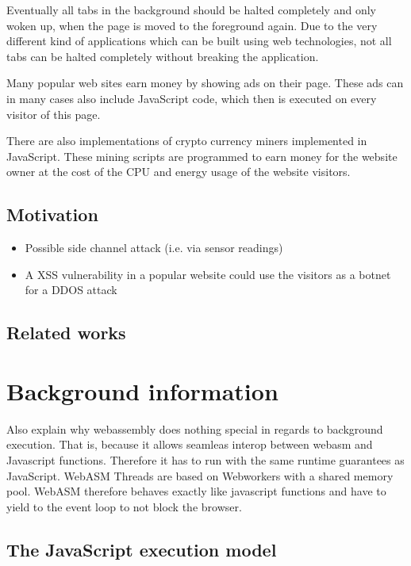 \documentclass[article,type=bsc,colorback,accentcolor=tud9c]{tudthesis}
\begin{document}
  Eventually all tabs in the background should be halted completely and only woken up, when the page is moved to the foreground again. Due to the very different kind of applications which can be built using web technologies, not all tabs can be halted completely without breaking the application.

  Many popular web sites earn money by showing ads on their page. These ads can in many cases also include JavaScript code, which then is executed on every visitor of this page.

  There are also implementations of crypto currency miners implemented in JavaScript. These mining scripts are programmed to earn money for the website owner at the cost of the CPU and energy usage of the website visitors.
  
  \subsection{Motivation}

  \begin{itemize}
  \item Possible side channel attack (i.e. via sensor readings)
  \item A XSS vulnerability in a popular website could use the visitors as a botnet for a DDOS attack
    
  \end{itemize}

  \subsection{Related works}

  
  \newpage
  \section{Background information}

  Also explain why webassembly does nothing special in regards to background execution. That is, because it allows seamleas interop between webasm and Javascript functions. Therefore it has to run with the same runtime guarantees as JavaScript. WebASM Threads are based on Webworkers with a shared memory pool.
  WebASM therefore behaves exactly like javascript functions and have to yield to the event loop to not block the browser.

  
  \subsection{The JavaScript execution model}
\end{document}
